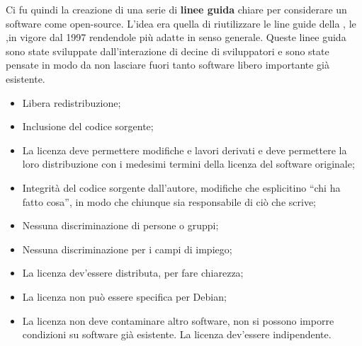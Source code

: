 Ci fu quindi la creazione di una serie di \textbf{linee guida} chiare per considerare un software come open-source. L'idea era quella di riutilizzare le line guide della , le ,in vigore dal 1997 rendendole più adatte in senso generale. Queste linee guida sono state sviluppate dall'interazione di decine di sviluppatori e sono state pensate in modo da non lasciare fuori tanto software libero importante già esistente.

\begin{itemize}

\item Libera redistribuzione;
\item Inclusione del codice sorgente;
\item La licenza deve permettere modifiche e lavori derivati e deve permettere la loro distribuzione con i medesimi termini della licenza del software originale;
\item Integrità del codice sorgente dall'autore, modifiche che esplicitino ``chi ha fatto cosa'', in modo che chiunque sia responsabile di ciò che scrive;
\item Nessuna discriminazione di persone o gruppi;
\item Nessuna discriminazione per i campi di impiego;
\item La licenza dev'essere distributa, per fare chiarezza;
\item La licenza non può essere specifica per Debian;
\item La licenza non deve contaminare altro software, non si possono imporre condizioni su software già esistente. La licenza dev'essere indipendente.

\end{itemize}

